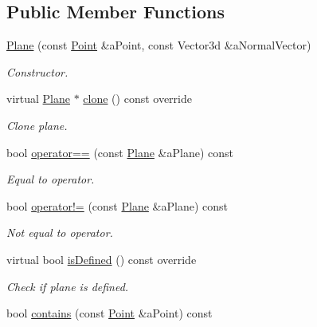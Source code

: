 \subsection*{Public Member Functions}
\begin{DoxyCompactItemize}
\item 
\hyperlink{classlibrary_1_1math_1_1geom_1_1d3_1_1objects_1_1_plane_a81fe78a983e2cb6ee6ad9bfabd22c3a4}{Plane} (const \hyperlink{classlibrary_1_1math_1_1geom_1_1d3_1_1objects_1_1_point}{Point} \&a\+Point, const Vector3d \&a\+Normal\+Vector)
\begin{DoxyCompactList}\small\item\em Constructor. \end{DoxyCompactList}\item 
virtual \hyperlink{classlibrary_1_1math_1_1geom_1_1d3_1_1objects_1_1_plane}{Plane} $\ast$ \hyperlink{classlibrary_1_1math_1_1geom_1_1d3_1_1objects_1_1_plane_a0b6a4ae7bef06f3995f8fd9d32a88870}{clone} () const override
\begin{DoxyCompactList}\small\item\em Clone plane. \end{DoxyCompactList}\item 
bool \hyperlink{classlibrary_1_1math_1_1geom_1_1d3_1_1objects_1_1_plane_a9391589825cac1db971b39452b38f8ea}{operator==} (const \hyperlink{classlibrary_1_1math_1_1geom_1_1d3_1_1objects_1_1_plane}{Plane} \&a\+Plane) const
\begin{DoxyCompactList}\small\item\em Equal to operator. \end{DoxyCompactList}\item 
bool \hyperlink{classlibrary_1_1math_1_1geom_1_1d3_1_1objects_1_1_plane_a5dfafb90b0da2cc239092ea6c655ec2a}{operator!=} (const \hyperlink{classlibrary_1_1math_1_1geom_1_1d3_1_1objects_1_1_plane}{Plane} \&a\+Plane) const
\begin{DoxyCompactList}\small\item\em Not equal to operator. \end{DoxyCompactList}\item 
virtual bool \hyperlink{classlibrary_1_1math_1_1geom_1_1d3_1_1objects_1_1_plane_aafbc8274c270be143b2fa3dc46459f17}{is\+Defined} () const override
\begin{DoxyCompactList}\small\item\em Check if plane is defined. \end{DoxyCompactList}\item 
bool \hyperlink{classlibrary_1_1math_1_1geom_1_1d3_1_1objects_1_1_plane_a7bb2f2a298461ee30c77ad653cfd195a}{contains} (const \hyperlink{classlibrary_1_1math_1_1geom_1_1d3_1_1objects_1_1_point}{Point} \&a\+Point) const

\end{DoxyCompactItemize}
